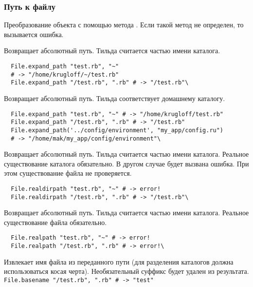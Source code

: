 \subsubsection*{Путь к файлу}

\begin{methodlist}
  Преобразование объекта с помощью метода . Если такой метод не определен, то вызывается ошибка. 

  Возвращает абсолютный путь. Тильда считается частью имени каталога.
  \begin{verbatim}
  File.expand_path "test.rb", "~"
  # -> "/home/krugloff/~/test.rb"
  File.expand_path "/test.rb", ".rb" # -> "/test.rb"\
  \end{verbatim}  

  Возвращает абсолютный путь. Тильда соответствует домашнему каталогу.
  \begin{verbatim}
  File.expand_path "test.rb", "~" # -> "/home/krugloff/test.rb" 
  File.expand_path "/test.rb", ".rb" # -> "/test.rb"
  File.expand_path('../config/environment', "my_app/config.ru") 
  # -> "/home/mak/my_app/config/environment"\
  \end{verbatim} 

  Возвращает абсолютный путь. Тильда считается частью имени каталога. Реальное существование каталога обязательно. В другом случае будет вызвана ошибка. При этом существование файла не проверяется.
  \begin{verbatim}
  File.realdirpath "test.rb", "~" # -> error!
  File.realdirpath "/test.rb", ".rb" # -> "/test.rb"\
  \end{verbatim} 

  Возвращает абсолютный путь. Тильда считается частью имени каталога. Реальное существование файла обязательно.
  \begin{verbatim}
  File.realpath "test.rb", "~" # -> error! 
  File.realpath "/test.rb", ".rb" # -> error!\
  \end{verbatim}

  Извлекает имя файла из переданного пути (для разделения каталогов должна использоваться косая черта). Необязательный суффикс будет удален из результата. 
  \\\verb!File.basename "/test.rb", ".rb" # -> "test"!


\end{methodlist}

